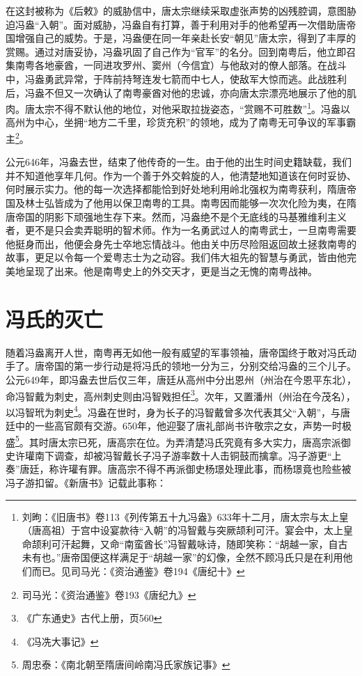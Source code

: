 在这封被称为《后敕》的威胁信中，唐太宗继续采取虚张声势的凶残腔调，意图胁迫冯盎“入朝”。面对威胁，冯盎自有打算，善于利用对手的他希望再一次借助唐帝国增强自己的威势。于是，冯盎便在同一年亲赴长安“朝见”唐太宗，得到了丰厚的赏赐。通过对唐妥协，冯盎巩固了自己作为“官军”的名分。回到南粤后，他立即召集南粤各地豪酋，一同进攻罗州、窦州（今信宜）与他敌对的僚人部落。在战斗中，冯盎勇武异常，于阵前持弩连发七箭而中七人，使敌军大惊而逃。此战胜利后，冯盎不但又一次确认了南粤豪酋对他的忠诚，亦向唐太宗漂亮地展示了他的肌肉。唐太宗不得不默认他的地位，对他采取拉拢姿态，“赏赐不可胜数”\footnote{刘昫：《旧唐书》卷113《列传第五十九冯盎》633年十二月，唐太宗与太上皇（唐高祖）于宫中设宴款待“入朝”的冯智戴与突厥颉利可汗。宴会中，太上皇命颉利可汗起舞，又命“南蛮酋长”冯智戴咏诗，随即笑称：“胡越一家，自古未有也。”唐帝国便这样满足于“胡越一家”的幻像，全然不顾冯氏只是在利用他们而已。见司马光：《资治通鉴》卷194《唐纪十》}。冯盎以高州为中心，坐拥“地方二千里，珍货充积”的领地，成为了南粤无可争议的军事霸主\footnote{司马光：《资治通鉴》卷193《唐纪九》}。

公元646年，冯盎去世，结束了他传奇的一生。由于他的出生时间史籍缺载，我们并不知道他享年几何。作为一个善于外交斡旋的人，他清楚地知道该在何时妥协、何时展示实力。他的每一次选择都能恰到好处地利用岭北强权为南粤获利，隋唐帝国及林士弘皆成为了他用以保卫南粤的工具。南粤因而能够一次次化险为夷，在隋唐帝国的阴影下顽强地生存下来。然而，冯盎绝不是个无底线的马基雅维利主义者，更不是只会卖弄聪明的智术师。作为一名勇武过人的南粤武士，一旦南粤需要他挺身而出，他便会身先士卒地忘情战斗。他由关中历尽险阻返回故土拯救南粤的故事，更足以令每一个爱粤志士为之动容。我们伟大祖先的智慧与勇武，皆由他完美地呈现了出来。他是南粤史上的外交天才，更是当之无愧的南粤战神。

\section{冯氏的灭亡}

随着冯盎离开人世，南粤再无如他一般有威望的军事领袖，唐帝国终于敢对冯氏动手了。唐帝国的第一步行动是将冯氏的领地一分为三，分别交给冯盎的三个儿子。公元649年，即冯盎去世后仅三年，唐廷从高州中分出恩州（州治在今恩平东北），命冯智戴为刺史，高州刺史则由冯智戣担任\footnote{《广东通史》古代上册，页560}。次年，又置潘州（州治在今茂名），以冯智玳为刺史\footnote{《冯冼大事记》}。冯盎在世时，身为长子的冯智戴曾多次代表其父“入朝”，与唐廷中的一些高官颇有交游。650年，他迎娶了唐礼部尚书许敬宗之女，声势一时极盛\footnote{周忠泰：《南北朝至隋唐间岭南冯氏家族记事》}。其时唐太宗已死，唐高宗在位。为弄清楚冯氏究竟有多大实力，唐高宗派御史许瓘南下调查，却被冯智戴长子冯子游率数十人击铜鼓而擒拿。冯子游更“上奏”唐廷，称许瓘有罪。唐高宗不得不再派御史杨璟处理此事，而杨璟竟也险些被冯子游扣留。《新唐书》记载此事称：

